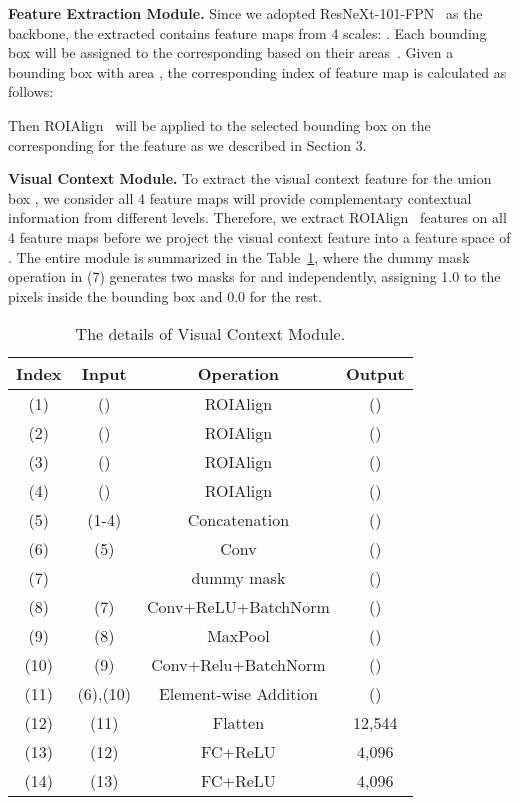 \documentclass[10pt,twocolumn,letterpaper]{article}
\begin{document}
\noindent\textbf{Feature Extraction Module.} Since we adopted ResNeXt-101-FPN~\cite{lin2017feature, xie2017aggregated} as the backbone, the extracted  contains feature maps from 4 scales: . Each bounding box will be assigned to the corresponding  based on their areas~\cite{massa2018mrcnn}. Given a bounding box  with area , the corresponding index  of feature map is calculated as follows:

Then ROIAlign~\cite{he2017mask} will be applied to the selected bounding box  on the corresponding  for the feature  as we described in Section 3.

\noindent\textbf{Visual Context Module.} To extract the visual context feature  for the union box , we consider all 4 feature maps will provide complementary contextual information from different levels. Therefore, we extract ROIAlign~\cite{he2017mask} features on all 4 feature maps before we project the visual context feature into a feature space of . The entire module is summarized in the Table~\ref{supp_tab:1}, where the dummy mask operation in (7) generates two masks for  and  independently, assigning 1.0 to the pixels inside the bounding box and 0.0 for the rest.


\begin{table}
\centering
\scalebox{0.8}
{
\begin{tabular}{| c | c | c | c |}
\hline
Index & Input & Operation & Output \\
\hline 
(1) & () & ROIAlign & () \\
\hline 
(2) & () & ROIAlign & () \\
\hline 
(3) & () & ROIAlign & () \\
\hline 
(4) & () & ROIAlign & () \\
\hline
(5) & (1-4) & Concatenation & () \\
\hline
(6) & (5) & Conv & () \\
\hline
(7) &  & dummy mask & () \\
\hline
(8) & (7) & Conv+ReLU+BatchNorm & () \\
\hline
(9) & (8) & MaxPool & () \\
\hline
(10) & (9) & Conv+Relu+BatchNorm & () \\
\hline
(11) & (6),(10) & Element-wise Addition & () \\
\hline
(12) & (11) & Flatten & 12,544 \\
\hline
(13) & (12) & FC+ReLU & 4,096 \\
\hline
(14) & (13) & FC+ReLU & 4,096 \\
\hline
\end{tabular}
}
\caption{The details of Visual Context Module.}
\label{supp_tab:1}
\end{table}
\end{document}
